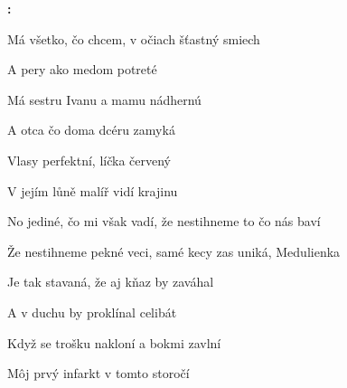 \begin{song}



\begin{hchordbox}
\end{hchordbox}

\large

\bigskip

\Intro\textbf{:}     \par

\bigskip

Má všetko, čo chcem, v očiach šťastný smiech \par
A pery ako medom potreté  \par
{}Má sestru Ivanu a mamu nádhernú \par
A otca čo doma dcéru zamyká  \par
{}Vlasy perfektní, líčka červený \par
V jejím lůně malíř vidí krajinu  \par

\bigskip

No jediné, čo mi však vadí, že nestihneme to čo nás baví \par
Že nestihneme pekné veci, samé kecy zas uniká, Medulienka \par

\bigskip

    \par

\bigskip

Je tak stavaná, že aj kňaz by zaváhal \par
A v duchu by proklínal celibát  \par
Když se trošku nakloní a bokmi zavlní \par
Môj prvý infarkt  v tomto storočí  \par


\end{song}
